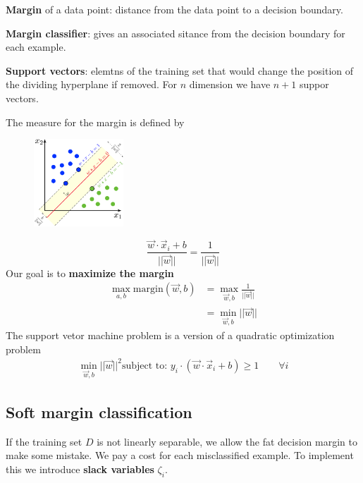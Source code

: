 \documentclass[a4paper,6pt,twocolumn,fleqn]{article}
\begin{document}
\textbf{Margin} of a data point: distance from the data point to a decision boundary.

\textbf{Margin classifier}: gives an associated sitance from the decision boundary for each example.

\textbf{Support vectors}: elemtns of the training set that would change the position of the dividing hyperplane if removed. For \(n\) dimension we have \(n+1\) suppor vectors.

The measure for the margin is defined by
\begin{figure}[h]
    \vspace{-10pt}
	\begin{center}
		\includegraphics[width=0.30\textwidth]{042}
	\end{center}
    \vspace{-20pt}
\end{figure}
\begin{equation}
    \frac {\vec w \cdot \vec x_i + b} {||\vec w||} = \frac 1 {||\vec w||}
\end{equation}
Our goal is to \textbf{maximize the margin}
\begin{align}
    \max_{a,b} \text{margin}(\vec w, b) & = \max_{\vec w,b} \frac 1 {||\vec w||}\\
    & = \min_{\vec w, b} ||\vec w||
\end{align}
The support vetor machine problem is a version of a quadratic optimization problem
\begin{align}
    \min_{\vec w,b} || \vec w ||^2
    \text{subject to: } y_i \cdot (\vec w \cdot \vec x_i + b) \geq 1 \qquad \forall i
\end{align}

\subsection{Soft margin classification} %
If the training set \(D\) is not linearly separable, we allow the fat decision margin to make some mistake. We pay a cost for each misclassified example. To implement this we introduce \textbf{slack variables} \(\zeta_i\).
\end{document}
